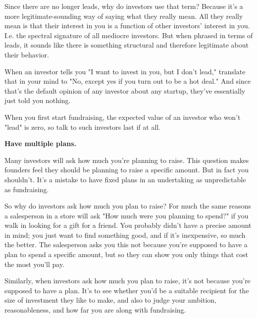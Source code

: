 Since there are
                    no longer leads, why do investors use that term? Because
                    it's a more legitimate-sounding way of saying what they
                    really mean. All they really mean is that their interest in
                    you is a function of other investors' interest in you. I.e.
                    the spectral signature of all mediocre investors. But when
                    phrased in terms of leads, it sounds like there is something
                    structural and therefore legitimate about their behavior.

When
                    an investor tells you "I want to invest in you, but I don't
                    lead," translate that in your mind to "No, except yes if you
                    turn out to be a hot deal." And since that's the default
                    opinion of any investor about any startup, they've
                    essentially just told you nothing.

When you first
                    start fundraising, the expected value of an investor who
                    won't "lead" is zero, so talk to such investors last if at
                    all.


                    \textbf{Have multiple plans.}

Many investors will
                    ask how much you're planning to raise. This question makes
                    founders feel they should be planning to raise a specific
                    amount. But in fact you shouldn't. It's a mistake to have
                    fixed plans in an undertaking as unpredictable as
                    fundraising.

So why do investors ask how much you
                    plan to raise? For much the same reasons a salesperson in a
                    store will ask "How much were you planning to spend?" if you
                    walk in looking for a gift for a friend. You probably didn't
                    have a precise amount in mind; you just want to find
                    something good, and if it's inexpensive, so much the better.
                    The salesperson asks you this not because you're supposed to
                    have a plan to spend a specific amount, but so they can show
                    you only things that cost the most you'll pay.

Similarly,
                    when investors ask how much you plan to raise, it's not
                    because you're supposed to have a plan. It's to see whether
                    you'd be a suitable recipient for the size of investment
                    they like to make, and also to judge your ambition,
                    reasonableness, and how far you are along with
                    fundraising.

